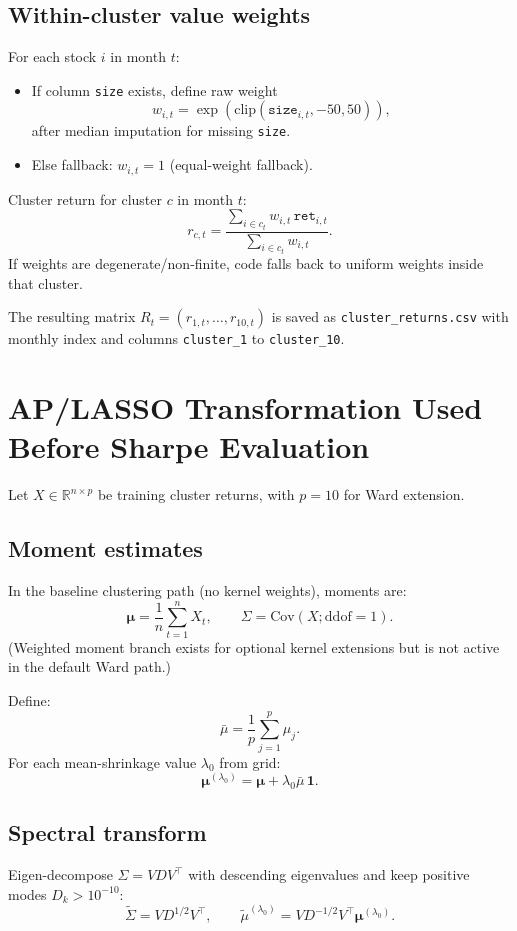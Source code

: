﻿\documentclass[11pt]{article}
\begin{document}
\subsection{Within-cluster value weights}
For each stock $i$ in month $t$:
\begin{itemize}
  \item If column \texttt{size} exists, define raw weight
  \[
  w_{i,t}=\exp\!\left(\mathrm{clip}(\texttt{size}_{i,t},-50,50)\right),
  \]
  after median imputation for missing \texttt{size}.
  \item Else fallback: $w_{i,t}=1$ (equal-weight fallback).
\end{itemize}

Cluster return for cluster $c$ in month $t$:
\[
r_{c,t}=\frac{\sum_{i\in c_t} w_{i,t}\,\texttt{ret}_{i,t}}{\sum_{i\in c_t} w_{i,t}}.
\]
If weights are degenerate/non-finite, code falls back to uniform weights inside that cluster.

The resulting matrix $R_t=(r_{1,t},\dots,r_{10,t})$ is saved as
\texttt{cluster\_returns.csv} with monthly index and columns \texttt{cluster\_1} to \texttt{cluster\_10}.

\section{AP/LASSO Transformation Used Before Sharpe Evaluation}
Let $X\in\mathbb R^{n\times p}$ be training cluster returns, with $p=10$ for Ward extension.

\subsection{Moment estimates}
In the baseline clustering path (no kernel weights), moments are:
\[
\bm\mu = \frac{1}{n}\sum_{t=1}^n X_t,\qquad
\Sigma = \mathrm{Cov}(X;\mathrm{ddof}=1).
\]
(Weighted moment branch exists for optional kernel extensions but is not active in the default Ward path.)

Define:
\[
\bar\mu = \frac{1}{p}\sum_{j=1}^p \mu_j.
\]
For each mean-shrinkage value $\lambda_0$ from grid:
\[
\bm\mu^{(\lambda_0)} = \bm\mu + \lambda_0\bar\mu\,\mathbf 1.
\]

\subsection{Spectral transform}
Eigen-decompose $\Sigma = VDV^\top$ with descending eigenvalues and keep positive modes $D_k>10^{-10}$:
\[
\tilde\Sigma = VD^{1/2}V^\top,
\qquad
\tilde\mu^{(\lambda_0)} = VD^{-1/2}V^\top\bm\mu^{(\lambda_0)}.
\]
\end{document}
